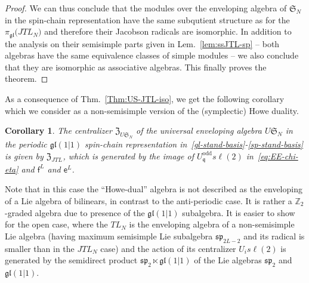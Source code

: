 \documentclass[11pt]{article}
\newcommand{\q}{\mathfrak{q}}
\newcommand{\TL}[1]{TL_{#1}}
\newcommand{\JTL}[1]{JTL_{#1}}
\newcommand{\LQGi}{U_{i} s\ell(2)}
\newcommand{\LQGodd}{U^{\text{odd}}_{\q} s\ell(2)}
\newcommand{\f}{\mathsf{f}}
\newcommand{\e}{\mathsf{e}}
\newcommand{\oZ}{\mathbb{Z}}
\newcommand{\interLie}{\mathfrak{S}}
\newcommand{\interfin}[1]{\interLie_{#1}}
\newcommand{\gl}{\mathfrak{gl}}
\newcommand{\ssp}{\mathfrak{sp}}
\newcommand{\repgl}{\pi_{\gl}}
\newcommand{\cent}{\mathfrak{Z}}
\newcommand{\centJTL}{\cent_{\JTL{}}}
\newtheorem{Cor}[subsection]{Corollary}%
\theoremstyle{definition}
\begin{document}
\begin{proof}
 We can thus conclude that  the modules over
the enveloping algebra of $\interfin{N}$ in the spin-chain representation have the same subqutient structure as for the $\repgl\bigl(\JTL{N}\bigr)$ and therefore their Jacobson radicals are isomorphic. In addition to the analysis  on their semisimple parts given in Lem.~\ref{lem:ssJTL-sp} -- both algebras have the same equivalence classes of  simple modules -- we also conclude  that they are isomorphic as associative algebras. This finally proves the theorem.
\end{proof}

As a consequence of  Thm.~\ref{Thm:US-JTL-iso}, we get the following corollary which we consider as a non-semisimple version of the (symplectic) Howe duality.

\begin{Cor}\label{cor:Howe-nss}
The centralizer $\cent_{U \interfin{N}}$ of the universal enveloping algebra $U \interfin{N}$ in the periodic $\gl(1|1)$ spin-chain representation in~\eqref{gl-stand-basis}-\eqref{sp-stand-basis} is given by $\centJTL$, which is generated by the image of $\LQGodd$ in~\eqref{eq:EE-chi-eta} and $\f^L$ and $\e^L$.
\end{Cor}

Note that in this case the ``Howe-dual'' algebra is not described as the enveloping of a Lie algebra of bilinears,  in contrast to the anti-periodic case. It is rather a $\oZ_2$-graded algebra due to presence of the $\gl(1|1)$ subalgebra. It is easier to show for the open case, where the $\TL{N}$ is the enveloping algebra of a non-semisimple Lie algebra (having maximum semisimple Lie subalgebra $\ssp_{2L-2}$ and its radical is smaller than in the $\JTL{N}$ case) and the action of its centralizer $\LQGi$  is generated by the semidirect product $\ssp_2\ltimes \gl(1|1)$ of the Lie algebras $\ssp_2$ and $\gl(1|1)$.
\end{document}
